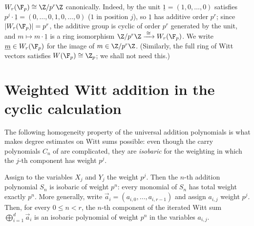 \begin{example}\label{example:witt_of_Fp}
$W_r(\F_p) \cong \Z/p^r\Z$ canonically. Indeed, by
 the unit $\underline 1 = (1, 0, \dots, 0)$ satisfies
$p^j \cdot \underline 1 = (0, \dots, 0, 1, 0, \dots, 0)$ ($1$ in position $j$), so
$\underline 1$ has additive order $p^r$; since $|W_r(\F_p)| = p^r$, the additive group
is cyclic of order $p^r$ generated by the unit, and $m \mapsto m \cdot \underline 1$
is a ring isomorphism $\Z/p^r\Z \xrightarrow{\;\cong\;} W_r(\F_p)$. We write
$\underline m \in W_r(\F_p)$ for the image of $m \in \Z/p^r\Z$. (Similarly, the full
ring of Witt vectors satisfies $W(\F_p) \cong \Z_p$; we shall not need this.)
\end{example}



\section{Weighted Witt addition in the cyclic calculation}

The following homogeneity property of the universal addition polynomials is what
makes degree estimates on Witt sums possible: even though the carry polynomials $C_n$
of  are complicated, they are \emph{isobaric} for the
weighting in which the $j$-th component has weight $p^j$.

\begin{lemma}\label{lemma:witt_addition_isobaric}
Assign to the variables $X_j$ and $Y_j$ the weight $p^j$. Then the $n$-th addition
polynomial $S_n$ is isobaric of weight $p^n$: every monomial of $S_n$ has total weight
exactly $p^n$. More generally, write
$\vec a_i=(a_{i,0},\dots,a_{i,r-1})$ and assign $a_{i,j}$ weight $p^j$.
Then, for every $0\leq n<r$, the $n$-th component of the iterated Witt sum
$\bigoplus_{i=1}^{d}\vec a_i$ is an isobaric polynomial of weight $p^n$ in the
variables $a_{i,j}$.
\end{lemma}

